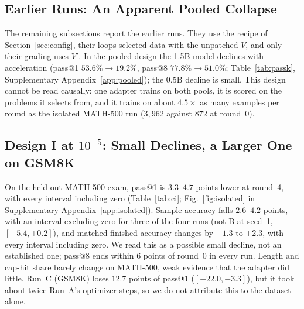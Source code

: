 \documentclass[runningheads]{llncs}
\begin{document}
\subsection{Earlier Runs: An Apparent Pooled Collapse}
\label{sec:pooled}

The remaining subsections report the earlier runs. They use the recipe of
Section~\ref{sec:config}, their loops selected data with the unpatched $V$, and
only their grading uses $V'$. In the pooled design the 1.5B model declines with
acceleration (pass@1 $53.6\%\to19.2\%$, pass@8 $77.8\%\to51.0\%$;
Table~\ref{tab:passk}, Supplementary Appendix~\ref{app:pooled}); the 0.5B
decline is small. This design cannot be read causally: one adapter trains on both
pools, it is scored on the problems it selects from, and it trains on about
$4.5\times$ as many examples per round as the isolated MATH-500 run ($3{,}962$
against $872$ at round~0).

\subsection{Design I at $10^{-5}$: Small Declines, a Larger One on GSM8K}
\label{sec:isolated}

On the held-out MATH-500 exam, pass@1 is $3.3$--$4.7$ points lower at round~4,
with every interval including zero (Table~\ref{tab:ci}; Fig.~\ref{fig:isolated}
in Supplementary Appendix~\ref{app:isolated}). Sample accuracy falls $2.6$--$4.2$
points, with an interval excluding zero for three of the four runs (not B at
seed~1, $[-5.4,+0.2]$), and matched finished accuracy changes by $-1.3$ to
$+2.3$, with every interval including zero. We read this as a possible small
decline, not an established one; pass@8 ends within $6$ points of round~0 in
every run. Length and cap-hit share barely change on MATH-500, weak evidence that
the adapter did little. Run~C (GSM8K) loses $12.7$ points of pass@1 ($[-22.0,-3.3]$), but it
took about twice Run~A's optimizer steps, so we do not attribute this to the
dataset alone.
\end{document}
